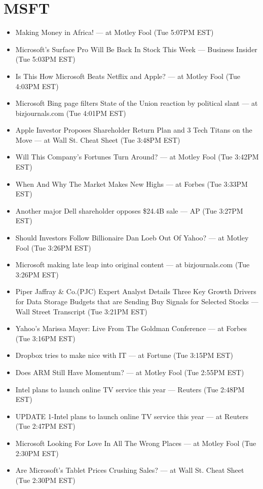 \documentclass[11pt,asymmetric]{article}
\begin{document}
\section*{MSFT}
\begin{itemize}
\item Making Money in Africa! --- at Motley Fool (Tue 5:07PM EST)
\item Microsoft's Surface Pro Will Be Back In Stock This Week --- Business Insider (Tue 5:03PM EST)
\item Is This How Microsoft Beats Netflix and Apple? --- at Motley Fool (Tue 4:03PM EST)
\item Microsoft Bing page filters State of the Union reaction by political slant --- at bizjournals.com (Tue 4:01PM EST)
\item Apple Investor Proposes Shareholder Return Plan and 3 Tech Titans on the Move --- at Wall St. Cheat Sheet (Tue 3:48PM EST)
\item Will This Company's Fortunes Turn Around? --- at Motley Fool (Tue 3:42PM EST)
\item When And Why The Market Makes New Highs --- at Forbes (Tue 3:33PM EST)
\item Another major Dell shareholder opposes \$24.4B sale --- AP (Tue 3:27PM EST)
\item Should Investors Follow Billionaire Dan Loeb Out Of Yahoo? --- at Motley Fool (Tue 3:26PM EST)
\item Microsoft making late leap into original content --- at bizjournals.com (Tue 3:26PM EST)
\item Piper Jaffray \& Co.(PJC) Expert Analyst Details Three Key Growth Drivers for Data Storage Budgets that are Sending Buy Signals for Selected Stocks --- Wall Street Transcript (Tue 3:21PM EST)
\item Yahoo's Marissa Mayer: Live From The Goldman Conference --- at Forbes (Tue 3:16PM EST)
\item Dropbox tries to make nice with IT --- at Fortune (Tue 3:15PM EST)
\item Does ARM Still Have Momentum? --- at Motley Fool (Tue 2:55PM EST)
\item Intel plans to launch online TV service this year --- Reuters (Tue 2:48PM EST)
\item UPDATE 1-Intel plans to launch online TV service this year --- at Reuters (Tue 2:47PM EST)
\item Microsoft Looking For Love In All The Wrong Places --- at Motley Fool (Tue 2:30PM EST)
\item Are Microsoft’s Tablet Prices Crushing Sales? --- at Wall St. Cheat Sheet (Tue 2:30PM EST)

\end{itemize}
\end{document}
